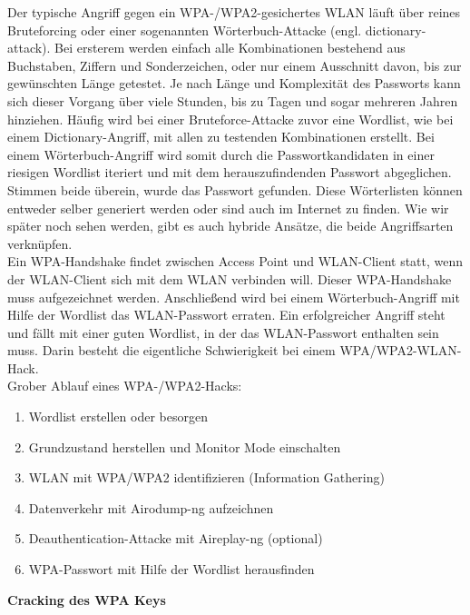 Der typische Angriff gegen ein WPA-/WPA2-gesichertes WLAN läuft über reines Bruteforcing oder einer sogenannten Wörterbuch-Attacke (engl. dictionary-attack). Bei ersterem werden einfach alle Kombinationen bestehend aus Buchstaben, Ziffern und Sonderzeichen, oder nur einem Ausschnitt davon, bis zur gewünschten Länge getestet. Je nach Länge und Komplexität des Passworts kann sich dieser Vorgang über viele Stunden, bis zu Tagen und sogar mehreren Jahren hinziehen. Häufig wird bei einer Bruteforce-Attacke zuvor eine Wordlist, wie bei einem Dictionary-Angriff, mit allen zu testenden Kombinationen erstellt. Bei einem Wörterbuch-Angriff wird somit durch die Passwortkandidaten in einer riesigen Wordlist iteriert und mit dem herauszufindenden Passwort abgeglichen. %
Stimmen beide überein, wurde das Passwort gefunden. Diese Wörterlisten können entweder selber generiert werden oder sind auch im Internet zu finden. Wie wir später noch sehen werden, gibt es auch hybride Ansätze, die beide Angriffsarten verknüpfen.\\


Ein WPA-Handshake findet zwischen Access Point und WLAN-Client statt, wenn der WLAN-Client sich mit dem WLAN verbinden will. Dieser WPA-Handshake muss aufgezeichnet werden. Anschließend wird bei einem Wörterbuch-Angriff mit Hilfe der Wordlist das WLAN-Passwort erraten. Ein erfolgreicher Angriff steht und fällt mit einer guten Wordlist, in der das WLAN-Passwort enthalten sein muss. Darin besteht die eigentliche Schwierigkeit bei einem WPA/WPA2-WLAN-Hack.\\


Grober Ablauf eines WPA-/WPA2-Hacks:

\begin{enumerate}
\item Wordlist erstellen oder besorgen 
\item Grundzustand herstellen und Monitor Mode einschalten
\item WLAN mit WPA/WPA2 identifizieren (Information Gathering) 
\item Datenverkehr mit Airodump-ng aufzeichnen
\item Deauthentication-Attacke mit Aireplay-ng (optional)
\item WPA-Passwort mit Hilfe der Wordlist herausfinden
\end{enumerate}


\textbf{\Large{Cracking des WPA Keys}}\\ %


